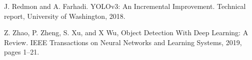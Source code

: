 \documentclass[conference]{IEEEtran}
\begin{document}
\begin{thebibliography}{00}
J. Redmon and A. Farhadi. YOLOv3: An Incremental Improvement. Technical report, University of Washington, 2018.

Z. Zhao, P. Zheng, S. Xu, and X Wu, Object Detection With Deep Learning: A Review. IEEE Transactions on Neural Networks and Learning Systems, 2019, pages 1–21.


\end{thebibliography}










\end{document}
